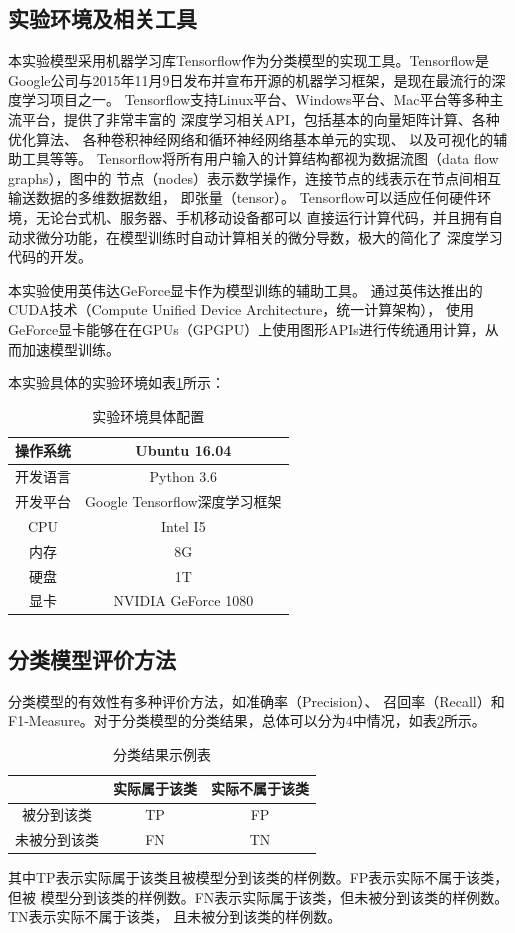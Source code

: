 \subsection{实验环境及相关工具}
本实验模型采用机器学习库Tensorflow作为分类模型的实现工具。Tensorflow是
Google公司与2015年11月9日发布并宣布开源的机器学习框架，是现在最流行的深度学习项目之一。
Tensorflow支持Linux平台、Windows平台、Mac平台等多种主流平台，提供了非常丰富的
深度学习相关API，包括基本的向量矩阵计算、各种优化算法、
各种卷积神经网络和循环神经网络基本单元的实现、
以及可视化的辅助工具等等。
Tensorflow将所有用户输入的计算结构都视为数据流图（data flow graphs），图中的
节点（nodes）表示数学操作，连接节点的线表示在节点间相互输送数据的多维数据数组，
即张量（tensor）。
Tensorflow可以适应任何硬件环境，无论台式机、服务器、手机移动设备都可以
直接运行计算代码，并且拥有自动求微分功能，在模型训练时自动计算相关的微分导数，极大的简化了
深度学习代码的开发。

本实验使用英伟达GeForce显卡作为模型训练的辅助工具。
通过英伟达推出的CUDA技术（Compute Unified Device Architecture，统一计算架构），
使用GeForce显卡能够在在GPUs（GPGPU）上使用图形APIs进行传统通用计算，从而加速模型训练。

本实验具体的实验环境如表\ref{train_env_table}所示：
\begin{table}[h]
    \caption{实验环境具体配置}
    \begin{tabular}{|c|c|}
        \hline
        操作系统 & Ubuntu 16.04 \\
        \hline
        开发语言 & Python 3.6 \\
        \hline
        开发平台 & Google Tensorflow深度学习框架 \\
        \hline
        CPU & Intel I5 \\
        \hline
        内存 & 8G \\
        \hline
        硬盘 & 1T \\
        \hline
        显卡 & NVIDIA GeForce 1080 \\
        \hline
    \end{tabular}
    \label{train_env_table}
\end{table}
\subsection{分类模型评价方法}
分类模型的有效性有多种评价方法，如准确率（Precision）、
召回率（Recall）和F1-Measure。对于分类模型的分类结果，总体可以分为4中情况，如表\ref{classification_demo_table}所示。
\begin{table}[h]
    \caption{分类结果示例表}
    \begin{tabular}{|c|c|c|}
        \hline
        & 实际属于该类 & 实际不属于该类 \\
        \hline
        被分到该类 & TP & FP \\
        \hline
        未被分到该类 & FN & TN \\
        \hline
    \end{tabular}
    \label{classification_demo_table}
\end{table}
其中TP表示实际属于该类且被模型分到该类的样例数。FP表示实际不属于该类，但被
模型分到该类的样例数。FN表示实际属于该类，但未被分到该类的样例数。TN表示实际不属于该类，
且未被分到该类的样例数。


